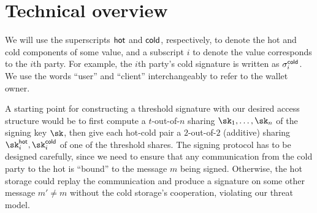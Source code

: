 \section{Technical overview}

We will use the superscripts $\mathsf{hot}$ and $\mathsf{cold}$, respectively, to denote the hot and cold components of some value, and a subscript $i$ to denote the value corresponds to the $i$th party. For example, the $i$th party's cold signature is written as $\sigma_i^{\mathsf{cold}}$. We use the words ``user'' and ``client'' interchangeably to refer to the wallet owner.

A starting point for constructing a threshold signature with our desired access structure would be to first compute a $t$-out-of-$n$ sharing $\sk_1, \dots, \sk_n$ of the signing key $\sk$, then give each hot-cold pair a $2$-out-of-$2$ (additive) sharing $\sk_i^\hot, \sk_i^\cold$ of one of the threshold shares. 
The signing protocol has to be designed carefully, since we need to ensure that any communication from the cold party to the hot is ``bound'' to the message $m$ being signed. Otherwise, the hot storage could replay the communication and produce a signature on some other message $m' \neq m$ without the cold storage's cooperation, violating our threat model.

